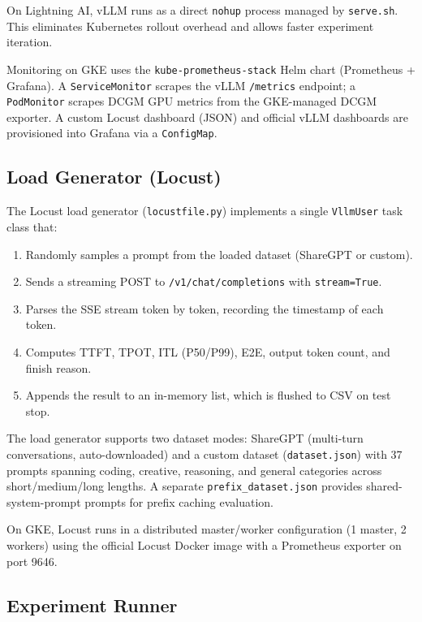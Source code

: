 \documentclass[a4paper,12pt]{report}
\begin{document}
On Lightning AI, vLLM runs as a direct \texttt{nohup} process managed by \texttt{serve.sh}. This eliminates Kubernetes rollout overhead and allows faster experiment iteration.

Monitoring on GKE uses the \texttt{kube-prometheus-stack} Helm chart (Prometheus + Grafana). A \texttt{ServiceMonitor} scrapes the vLLM \texttt{/metrics} endpoint; a \texttt{PodMonitor} scrapes DCGM GPU metrics from the GKE-managed DCGM exporter. A custom Locust dashboard (JSON) and official vLLM dashboards are provisioned into Grafana via a \texttt{ConfigMap}.

\subsection{Load Generator (Locust)}

The Locust load generator (\texttt{locustfile.py}) implements a single \texttt{VllmUser} task class that:

\begin{enumerate}
    \item Randomly samples a prompt from the loaded dataset (ShareGPT or custom).
    \item Sends a streaming POST to \texttt{/v1/chat/completions} with \texttt{stream=True}.
    \item Parses the SSE stream token by token, recording the timestamp of each token.
    \item Computes TTFT, TPOT, ITL (P50/P99), E2E, output token count, and finish reason.
    \item Appends the result to an in-memory list, which is flushed to CSV on test stop.
\end{enumerate}

The load generator supports two dataset modes: ShareGPT (multi-turn conversations, auto-downloaded) and a custom dataset (\texttt{dataset.json}) with 37 prompts spanning coding, creative, reasoning, and general categories across short/medium/long lengths. A separate \texttt{prefix\_dataset.json} provides shared-system-prompt prompts for prefix caching evaluation.

On GKE, Locust runs in a distributed master/worker configuration (1 master, 2 workers) using the official Locust Docker image with a Prometheus exporter on port 9646.

\subsection{Experiment Runner}
\end{document}
